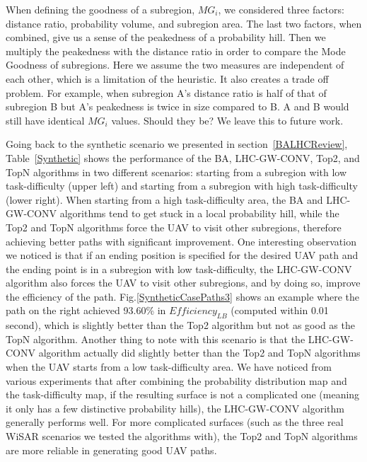 When defining the goodness of a subregion, $MG_i$, we considered three factors: distance ratio, probability volume, and subregion area. The last two factors, when combined, give us a sense of the peakedness of a probability hill. Then we multiply the peakedness with the distance ratio in order to compare the Mode Goodness of subregions. Here we assume the two measures are independent of each other, which is a limitation of the heuristic. It also creates a trade off problem. For example, when subregion A's distance ratio is half of that of subregion B but A's peakedness is twice in size compared to B. A and B would still have identical $MG_i$ values. Should they be? We leave this to future work.

Going back to the synthetic scenario we presented in section~\ref{BALHCReview}, Table~\ref{Synthetic} shows the performance of the BA, LHC-GW-CONV, Top2, and TopN algorithms in two different scenarios: starting from a subregion with low task-difficulty (upper left) and starting from a subregion with high task-difficulty (lower right). When starting from a high task-difficulty area, the BA and LHC-GW-CONV algorithms tend to get stuck in a local probability hill, while the Top2 and TopN algorithms force the UAV to visit other subregions, therefore achieving better paths with significant improvement. One interesting observation we noticed is that if an ending position is specified for the desired UAV path and the ending point is in a subregion with low task-difficulty, the LHC-GW-CONV algorithm also forces the UAV to visit other subregions, and by doing so, improve the efficiency of the path. Fig.\ref{SyntheticCasePaths3} shows an example where the path on the right achieved 93.60\% in $\mathit{Efficiency_{LB}}$ (computed within 0.01 second), which is slightly better than the Top2 algorithm but not as good as the TopN algorithm. Another thing to note with this scenario is that the LHC-GW-CONV algorithm actually did slightly better than the Top2 and TopN algorithms when the UAV starts from a low task-difficulty area. We have noticed from various experiments that after combining the probability distribution map and the task-difficulty map, if the resulting surface is not a complicated one (meaning it only has a few distinctive probability hills), the LHC-GW-CONV algorithm generally performs well. For more complicated surfaces (such as the three real WiSAR scenarios we tested the algorithms with), the Top2 and TopN algorithms are more reliable in generating good UAV paths. 


